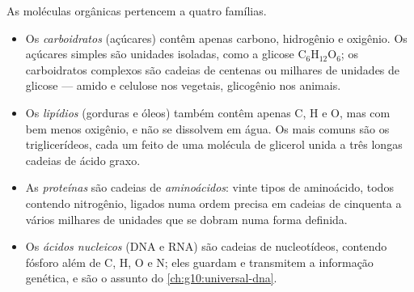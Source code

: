 \begin{definition}\label{def:g10:chemistry-of-life:families}
As moléculas orgânicas pertencem a quatro famílias.
\begin{itemize}
  \item Os \emph{carboidratos} (açúcares) contêm
        apenas carbono, hidrogênio e oxigênio. Os açúcares simples são
        unidades isoladas, como a glicose $\mathrm{C_6H_{12}O_6}$; os
        carboidratos complexos são cadeias de centenas ou milhares de
        unidades de glicose --- amido e celulose nos vegetais,
        glicogênio nos animais.
  \item Os \emph{lipídios} (gorduras e óleos) também
        contêm apenas C, H e O, mas com bem menos oxigênio, e não se
        dissolvem em água. Os mais comuns são os triglicerídeos, cada
        um feito de uma molécula de glicerol unida a três longas
        cadeias de ácido graxo.
  \item As \emph{proteínas} são cadeias de
        \emph{aminoácidos}: vinte tipos de
        aminoácido, todos contendo nitrogênio, ligados numa ordem
        precisa em cadeias de cinquenta a vários milhares de unidades
        que se dobram numa forma definida.
  \item Os \emph{ácidos nucleicos} (DNA e RNA)
        são cadeias de nucleotídeos, contendo fósforo além de C, H, O e
        N; eles guardam e transmitem a informação genética, e são o
        assunto do \cref{ch:g10:universal-dna}.
\end{itemize}
\end{definition}

